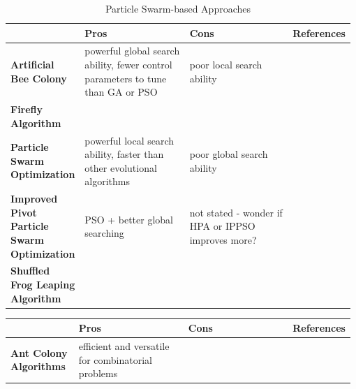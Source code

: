 \documentclass[12pt]{article}
\begin{document}
\begin{landscape}
\begin{table}
	\singlespacing
	\footnotesize
\begin{tabular}{  p{0.2\linewidth} p{0.34\linewidth} p{0.34\linewidth} p{0.1\linewidth} }
 \hline
 &  \textbf{Pros}  & \textbf{Cons} & \textbf{References} \\
 \hline
 
 \textbf{Artificial Bee Colony} & \textcolor{medblue}{powerful global search ability, fewer control parameters to tune than GA or PSO} & \textcolor{medblue}{poor local search ability} &  \textcolor{medblue}{\cite{Oliveira:2011}} \\
 
 \textbf{Firefly Algorithm} & & & \textcolor{medblue}{\cite{Poursalehi:2015}} \\
 
 \textbf{Particle Swarm Optimization} & \textcolor{medblue}{powerful local search ability, faster than other evolutional algorithms} & \textcolor{medblue}{poor global search ability} & \textcolor{medblue}{\cite{Yadav:2011,Wang:2013,Waintraub:2009,Carlos:2012,Camara-Augusto:2015,De-Moura-Meneses:2009,Zameer:2014,De-Moura-Meneses:2010,Khoshahval:2014a}} \\
 
 \textbf{Improved Pivot Particle Swarm Optimization} & \textcolor{medblue}{PSO + better global searching} & \textcolor{medblue}{not stated - wonder if HPA or IPPSO improves more?} & \textcolor{medblue}{\cite{Liu:2012}} \\
 
 \textbf{Shuffled Frog Leaping Algorithm} & & & \textcolor{medblue}{\cite{Arshi:2014}} \\
 
 \hline
\end{tabular}
\caption{Particle Swarm-based Approaches}\label{table:pso} 
\end{table}

\begin{table}
	\singlespacing
	\footnotesize
\begin{tabular}{  p{0.2\linewidth} p{0.34\linewidth} p{0.34\linewidth} p{0.1\linewidth} }
 \hline
 &  \textbf{Pros}  & \textbf{Cons} & \textbf{References} \\
 \hline
 
 \textbf{Ant Colony Algorithms} & \textcolor{medblue}{efficient and versatile for combinatorial problems} & & \textcolor{medblue}{\cite{Lin:2012,Machado:2002,Lima:2007,Lima:2008,Lin:2014,Silva:2011a}} \\
 

\end{tabular}
\end{table}
\end{landscape}
\end{document}

